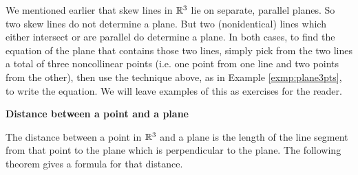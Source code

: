 We mentioned earlier that skew lines in $\mathbb{R}^{3}$ lie on separate, parallel planes. 
So two skew lines do not determine
a plane. 
But two (nonidentical) lines which either intersect or are parallel do determine a plane. 
In both cases, to
find the equation of the plane that contains those two lines, simply pick from the two lines a total of three
noncollinear points (i.e. one point from one line and two points from the other), then use the technique above, as in
Example \ref{exmp:plane3pts}, to write the equation. We will leave examples of this as exercises for the reader.
\pagebreak[3]
\par\noindent\textbf{\large{Distance between a point and a plane}}\normalsize\smallskip

The distance between a point in $\mathbb{R}^{3}$ and a plane is the length of the line segment from that point to the plane
which is perpendicular to the plane. 
The following theorem gives a formula for that distance.
